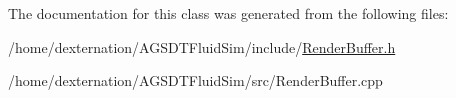 The documentation for this class was generated from the following files\-:\begin{DoxyCompactItemize}
\item 
/home/dexternation/\-A\-G\-S\-D\-T\-Fluid\-Sim/include/\hyperlink{_render_buffer_8h}{Render\-Buffer.\-h}\item 
/home/dexternation/\-A\-G\-S\-D\-T\-Fluid\-Sim/src/Render\-Buffer.\-cpp\end{DoxyCompactItemize}
